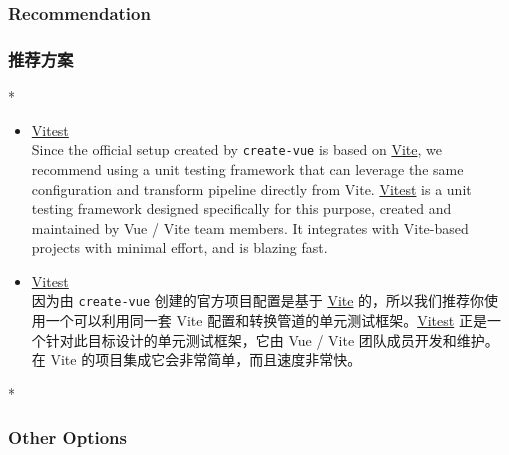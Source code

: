 \begin{paracol}{2}
\subsubsection{Recommendation}
\switchcolumn
\subsubsection{推荐方案}
\switchcolumn[0]*%
\begin{itemize}
\item
  \href{https://vitest.dev/}{Vitest}\\
  Since the official setup created by \texttt{create-vue} is based on
  \href{https://vitejs.dev/}{Vite}, we recommend using a unit testing
  framework that can leverage the same configuration and transform
  pipeline directly from Vite. \href{https://vitest.dev/}{Vitest} is a
  unit testing framework designed specifically for this purpose, created
  and maintained by Vue / Vite team members. It integrates with
  Vite-based projects with minimal effort, and is blazing fast.
\end{itemize}
\switchcolumn
\begin{itemize}
\item
  \href{https://vitest.dev/}{Vitest}\\
  因为由 \texttt{create-vue} 创建的官方项目配置是基于
  \href{https://cn.vitejs.dev/}{Vite}
  的，所以我们推荐你使用一个可以利用同一套 Vite
  配置和转换管道的单元测试框架。\href{https://cn.vitest.dev/}{Vitest}
  正是一个针对此目标设计的单元测试框架，它由 Vue / Vite
  团队成员开发和维护。在 Vite 的项目集成它会非常简单，而且速度非常快。
\end{itemize}
\switchcolumn[0]*%
\subsubsection{Other Options}
\switchcolumn

\end{paracol}
